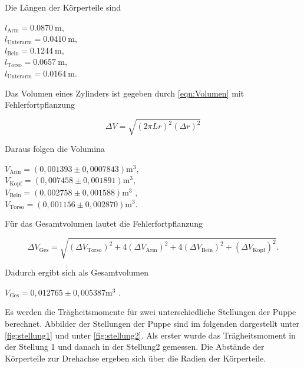Die Längen der Körperteile sind
\begin{center}
  $l_{\text{Arm}} = \SI{0,0870}{\meter}$, \\
  $l_{\text{Unterarm}} = \SI{0,0410}{\meter}$, \\
  $l_{\text{Bein}} = \SI{0,1244}{\meter}$, \\
  $l_{\text{Torso}} = \SI{0,0657}{\meter}$, \\
  $l_{\text{Unterarm}} = \SI{0,0164}{\meter}$. \\
\end{center}

Das Volumen eines Zylinders ist gegeben durch \autoref{eqn:Volumen} mit Fehlerfortpflanzung

\begin{equation*}
  \Delta V = \sqrt{(2 \pi Lr)^2 (\Delta r)^2}
\end{equation*}


Daraus folgen die Volumina

\begin{center}
  $V_{\text{Arm}} = (0,001393 \pm 0,0007843) \si{\meter}^3$, \\
  $V_{\text{Kopf}} = (0,007458 \pm 0,001891) \si{\meter}^3$, \\
  $V_{\text{Bein}} = (0,002758 \pm 0,001588) \si{\meter}^3$ ,\\
  $V_{\text{Torso}} = (0,001156 \pm 0,002870) \si{\meter}^3$. \\
\end{center}


Für das Gesamtvolumen lautet die Fehlerfortpflanzung

\begin{equation}
  \Delta V_{\text{Ges}} = \sqrt{(\Delta V_{\text{Torso}})^2 + 4(\Delta V_{\text{Arm}})^2 + 4(\Delta V_{\text{Bein}})^2 + (\Delta V_{\text{Kopf}})^2}.
\end{equation}


Dadurch ergibt sich als Gesamtvolumen

\begin{center}
  $V_{\text{Ges}} = 0,012765 \pm 0,005387 \si{\meter}^3$ .
\end{center}


Es werden die Trägheitsmomente für zwei unterschiedliche Stellungen der Puppe berechnet. Abbilder der Stellungen der Puppe sind im folgenden
dargestellt unter \autoref{fig:stellung1} und unter \autoref{fig:stellung2}. 
Als erster wurde das Trägheitsmoment in der Stellung 1 und danach in der Stellung2 gemessen.
Die Abstände der Körperteile zur Drehachse ergeben sich über die Radien der Körperteile.

